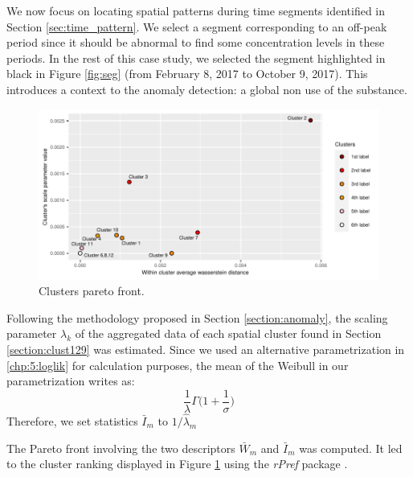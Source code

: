 We now focus on locating spatial patterns during time segments identified in Section \ref{sec:time_pattern}. We select a segment corresponding to an off-peak period since it should be abnormal to find some concentration levels in these periods. In the rest of this case study, we selected the segment highlighted in black in Figure \ref{fig:seg} (from February 8, 2017 to October 9, 2017). 
This introduces a context to the anomaly detection: a global non use of the substance. 

\begin{figure}[htbp]
  \centering
  \includegraphics[]{figs/Chap5/Pareto_plot.pdf}
  \caption{Clusters pareto front.}
  \label{fig:pareto:plot}
\end{figure}


Following the methodology proposed in Section \ref{section:anomaly}, the scaling parameter $\lambda_k$ of the aggregated data of each spatial cluster found in Section \ref{section:clust129} was estimated. Since we used an alternative parametrization in \eqref{chp:5:loglik} for calculation purposes, the mean of the Weibull in our parametrization writes as:
\begin{equation}
\frac{1}{\lambda}\Gamma\bigg(1+\frac{1}{\sigma}\bigg)
\end{equation}
Therefore, we set statistics $\bar{I}_m$ to $1/\hat{\lambda}_m$ 

The Pareto front involving the two descriptors $\bar{W}_m$ and $\bar{I}_m$ was computed. It led to the cluster ranking displayed in Figure \ref{fig:pareto:plot} using the \emph{rPref} package \cite{RJ-2016-054}. 

